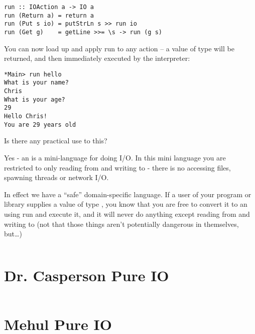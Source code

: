 \documentclass[thesis-solanki.tex]{subfiles}
\begin{document}
\begin{verbatim}
run :: IOAction a -> IO a
run (Return a) = return a
run (Put s io) = putStrLn s >> run io
run (Get g)    = getLine >>= \s -> run (g s)
\end{verbatim}

You can now load up  and apply run to any action --
a value of type   will be returned, and then immediately executed by the 
interpreter:

\begin{verbatim}
*Main> run hello
What is your name?
Chris
What is your age?
29
Hello Chris!
You are 29 years old

\end{verbatim}
Is there any practical use to this?

Yes -
an  is a mini-language for doing I/O. In this mini language you are restricted to only reading from  and writing to  -
there is no accessing files, spawning threads or network I/O.

In effect we have a 
``safe'' domain-specific language.
If a user of your program or library supplies a value of type  , you know that you are free to convert it to an   using run and execute it, 
and it will never do anything except reading from  and writing to  (not that those things aren't potentially dangerous in themselves, but\dots)


\begin{singlespace}
  \inputminted[linenos]{haskell}{haskell-proto4-purvey-wincer.hs}
\end{singlespace}

\section{Dr. Casperson Pure IO}
\begin{singlespace}
  \inputminted[linenos]{haskell}{haskell-proto4-myrtle-uppers.hs}
\end{singlespace}

\section{Mehul Pure IO}
\end{document}
